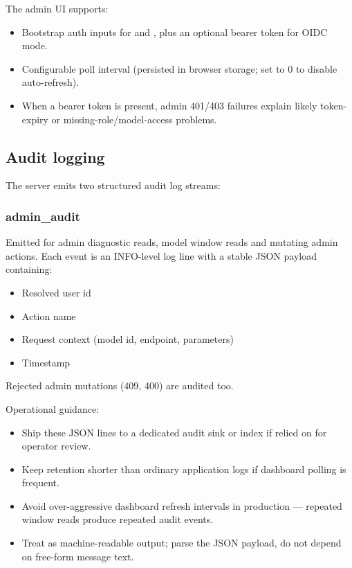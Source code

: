 The admin UI supports:

\begin{itemize}
\item Bootstrap auth inputs for  and
  , plus an optional bearer token for OIDC mode.
\item Configurable poll interval (persisted in browser storage; set to 0 to
  disable auto-refresh).
\item When a bearer token is present, admin 401/403 failures explain likely
  token-expiry or missing-role/model-access problems.
\end{itemize}

\subsection{Audit logging}

The server emits two structured audit log streams:

\subsubsection{admin\_audit}

Emitted for admin diagnostic reads, model window reads and mutating admin
actions. Each event is an INFO-level log line with a stable JSON payload
containing:

\begin{itemize}
\item Resolved user id
\item Action name
\item Request context (model id, endpoint, parameters)
\item Timestamp
\end{itemize}

Rejected admin mutations (409, 400) are audited too.

Operational guidance:

\begin{itemize}
\item Ship these JSON lines to a dedicated audit sink or index if relied on
  for operator review.
\item Keep retention shorter than ordinary application logs if dashboard
  polling is frequent.
\item Avoid over-aggressive dashboard refresh intervals in production ---
  repeated window reads produce repeated audit events.
\item Treat  as machine-readable output; parse the JSON
  payload, do not depend on free-form message text.
\end{itemize}

